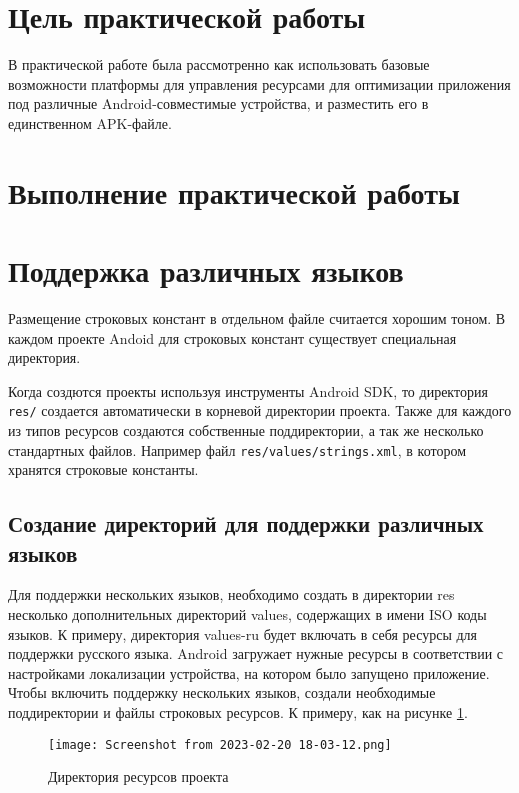 \graphicspath{{~/Documents/MobAppDev/SecondTask/PNG}}
\section*{\LARGE{Цель практической работы}}
В практической работе была рассмотренно как использовать базовые возможности
платформы для управления ресурсами для оптимизации приложения
под различные Android-совместимые устройства, и разместить его в
единственном APK-файле.

\newpage

\section*{\LARGE{Выполнение практической работы}}

\section{Поддержка различных языков}
Размещение строковых констант в отдельном файле считается хорошим
тоном. В каждом проекте Andoid для строковых констант существует
специальная директория.\par
Когда создются проекты используя инструменты Android SDK, то
директория \texttt{res/} создается автоматически в корневой директории
проекта. Также для каждого из типов ресурсов создаются собственные
поддиректории, а так же несколько стандартных файлов. Например
файл \texttt{res/values/strings.xml}, в котором хранятся строковые константы.

\subsection{Создание директорий для поддержки различных языков}
Для поддержки нескольких языков, необходимо создать в директории res
несколько дополнительных директорий values, содержащих в имени ISO
коды языков. К примеру, директория values-ru будет включать в себя ресурсы
для поддержки русского языка.
Android загружает нужные ресурсы в соответствии с настройками
локализации устройства, на котором было запущено приложение.
Чтобы включить поддержку нескольких языков, создали
необходимые поддиректории и файлы строковых ресурсов. К примеру, как
на рисунке \ref{fig:res:values}.

\begin{figure}[h!tp]
	\centering
	\texttt{[image: Screenshot from 2023-02-20 18-03-12.png]}
	\caption{Директория ресурсов проекта}
	\label{fig:res:values}
\end{figure}

